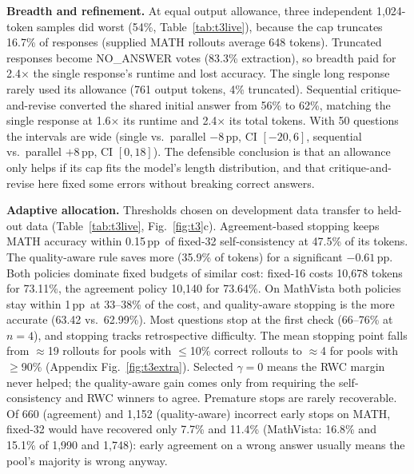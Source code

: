 \documentclass{article}
\newcommand{\pp}{\,pp}
\begin{document}
\textbf{Breadth and refinement.} At equal output allowance, three independent 1{,}024-token samples did worst (54\%, Table~\ref{tab:t3live}), because the cap truncates 16.7\% of responses (supplied MATH rollouts average 648 tokens). Truncated responses become NO\_ANSWER votes (83.3\% extraction), so breadth paid for 2.4$\times$ the single response's runtime and lost accuracy. The single long response rarely used its allowance (761 output tokens, 4\% truncated). Sequential critique-and-revise \citep{madaan2023selfrefine} converted the shared initial answer from 56\% to 62\%, matching the single response at 1.6$\times$ its runtime and 2.4$\times$ its total tokens. With 50 questions the intervals are wide (single vs.\ parallel $-8$\pp, CI $[-20, 6]$, sequential vs.\ parallel $+8$\pp, CI $[0, 18]$). The defensible conclusion is that an allowance only helps if its cap fits the model's length distribution, and that critique-and-revise here fixed some errors without breaking correct answers.

\textbf{Adaptive allocation.} Thresholds chosen on development data transfer to held-out data (Table~\ref{tab:t3live}, Fig.~\ref{fig:t3}c). Agreement-based stopping keeps MATH accuracy within 0.15\pp\ of fixed-32 self-consistency at 47.5\% of its tokens. The quality-aware rule saves more (35.9\% of tokens) for a significant $-0.61$\pp. Both policies dominate fixed budgets of similar cost: fixed-16 costs 10{,}678 tokens for 73.11\%, the agreement policy 10{,}140 for 73.64\%. On MathVista both policies stay within 1\pp\ at 33--38\% of the cost, and quality-aware stopping is the more accurate (63.42 vs.\ 62.99\%). Most questions stop at the first check (66--76\% at $n{=}4$), and stopping tracks retrospective difficulty. The mean stopping point falls from $\approx$19 rollouts for pools with $\le$10\% correct rollouts to $\approx$4 for pools with $\ge$90\% (Appendix Fig.~\ref{fig:t3extra}). Selected $\gamma{=}0$ means the RWC margin never helped; the quality-aware gain comes only from requiring the self-consistency and RWC winners to agree. Premature stops are rarely recoverable. Of 660 (agreement) and 1{,}152 (quality-aware) incorrect early stops on MATH, fixed-32 would have recovered only 7.7\% and 11.4\% (MathVista: 16.8\% and 15.1\% of 1{,}990 and 1{,}748): early agreement on a wrong answer usually means the pool's majority is wrong anyway.
\end{document}

